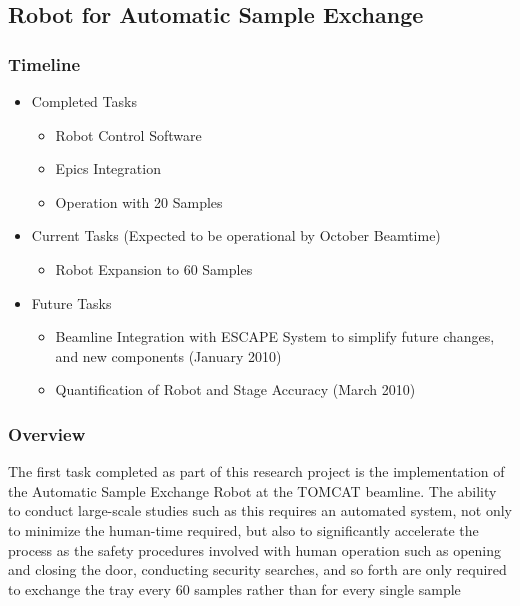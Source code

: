 
\subsection{Robot for Automatic Sample Exchange}
\subsubsection*{Timeline}
\begin{itemize}
 	\item Completed Tasks
	\begin{itemize}
		\item Robot Control Software
		\item Epics Integration
		\item Operation with 20 Samples
	\end{itemize}
	\item Current Tasks (Expected to be operational by October Beamtime)
	\begin{itemize}
		\item Robot Expansion to 60 Samples
	\end{itemize}
	\item Future Tasks
	\begin{itemize}
		\item Beamline Integration with ESCAPE System to simplify future changes, and new components (January 2010)
		\item Quantification of Robot and Stage Accuracy (March 2010)
	\end{itemize}
\end{itemize}
\subsubsection*{Overview}
The first task completed as part of this research project is the implementation of the Automatic Sample Exchange Robot at the TOMCAT beamline. The ability to conduct large-scale studies such as this requires an automated system, not only to minimize the human-time required, but also to significantly accelerate the process as the safety procedures  involved with human operation such as opening and closing the door, conducting security searches, and so forth are only required to exchange the tray every 60 samples rather than for every single sample

